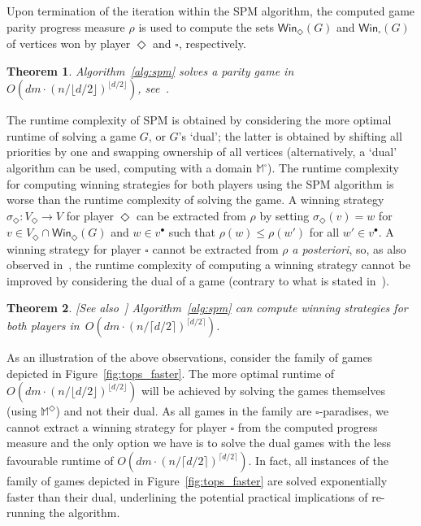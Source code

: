 \documentclass{eptcs}
\newtheorem{theo}{Theorem}
\newenvironment{theorem}{\begin{theo} \rm }{\end{theo}}
\newcommand{\odd}{\ensuremath{\square}\xspace}
\newcommand{\even}{\ensuremath{\Diamond}\xspace}
\newcommand{\post}[1]{\ensuremath{#1^{\bullet}}}
\newcommand{\winsubodd}[1]{\textsf{Win}_{\odd}(#1)}
\newcommand{\winsubeven}[1]{\textsf{Win}_{\even}(#1)}
\def\runtimeceil{O(dm \cdot (n/\lceil d / 2 \rceil)^{\lceil d/2 \rceil})}
\def\runtimefloor{O(dm \cdot (n/\lfloor d / 2 \rfloor)^{\lfloor d/2 \rfloor})}
\begin{document}
Upon termination of the iteration within the SPM algorithm, the
computed game parity progress measure $\rho$ is used to compute the
sets $\winsubeven{G}$ and $\winsubodd{G}$ of vertices won by player $\even$ and
$\odd$, respectively.
\begin{theorem} Algorithm~\ref{alg:spm} solves a parity
game in $\runtimefloor$, see~\cite{Jur:00}.
\end{theorem}

The runtime complexity of SPM is obtained by considering the more optimal
runtime of solving a game $G$, or $G$'s `dual'; the latter is obtained by shifting
all priorities by one and swapping ownership of all vertices (alternatively,
a `dual' algorithm can be used, computing with a domain $\mathbb{M}^\odd$). 
The runtime complexity for computing winning strategies for both players using
the SPM algorithm is worse than the runtime complexity of solving the game.  
A winning strategy
$\sigma_\even {:} V_\even \to V$ for player $\even$ can be extracted
from $\rho$ by setting $\sigma_\even(v) = w$ for $v \in V_\even
\cap \winsubeven{G}$ and $w \in \post{v}$ such that $\rho(w) \le \rho(w')$
for all $w' \in \post{v}$.  A winning strategy for player $\odd$
cannot be extracted from $\rho$ \emph{a posteriori}, so, as also
observed in~\cite{Sch:07}, the runtime
complexity of computing a winning strategy cannot be improved by
considering the dual of a game (contrary to what is stated in~\cite{Jur:00}). 
\begin{theorem}[See also~\cite{Sch:07}]
Algorithm~\ref{alg:spm} can compute
winning strategies for both players in~$\runtimeceil$. 
\end{theorem}
As an illustration of the above observations, consider the family of games
depicted in Figure~\ref{fig:tops_faster}. The more optimal runtime
of $\runtimefloor$ will be achieved by solving the games themselves
(using $\mathbb{M}^\even$) and not their dual. As all games in the family are
$\odd$-paradises, we cannot extract a winning strategy for player
$\odd$ from the computed progress measure and the only option we have is to 
solve the dual games with the less favourable runtime of $\runtimeceil$.
In fact, all instances of the family of games depicted in
Figure~\ref{fig:tops_faster} are solved exponentially faster than
their dual, underlining the potential practical implications of re-running
the algorithm.
\end{document}
